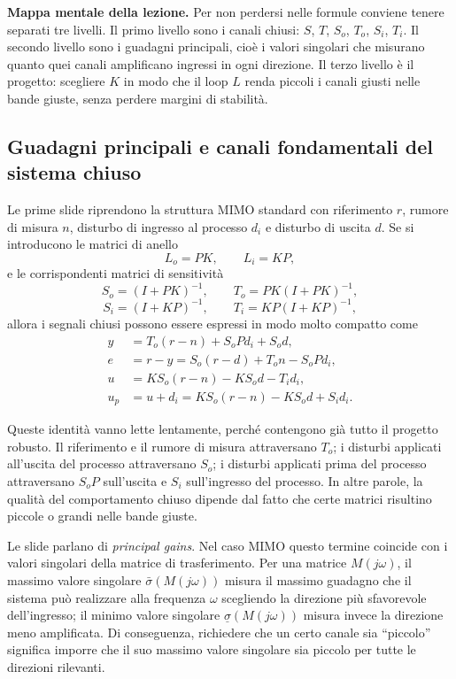 \documentclass[11pt,a4paper]{article}
\begin{document}
\begin{focusbox}
\textbf{Mappa mentale della lezione.} Per non perdersi nelle formule conviene tenere separati tre livelli. Il primo livello sono i canali chiusi: $S$, $T$, $S_o$, $T_o$, $S_i$, $T_i$. Il secondo livello sono i guadagni principali, cioè i valori singolari che misurano quanto quei canali amplificano ingressi in ogni direzione. Il terzo livello è il progetto: scegliere $K$ in modo che il loop $L$ renda piccoli i canali giusti nelle bande giuste, senza perdere margini di stabilità.
\end{focusbox}

\subsection{Guadagni principali e canali fondamentali del sistema chiuso}

Le prime slide riprendono la struttura MIMO standard con riferimento $r$, rumore di misura $n$, disturbo di ingresso al processo $d_i$ e disturbo di uscita $d$. Se si introducono le matrici di anello
$$
L_o = PK,
\qquad
L_i = KP,
$$
e le corrispondenti matrici di sensitività
$$
S_o = (I + PK)^{-1},
\qquad
T_o = PK(I + PK)^{-1},
$$
$$
S_i = (I + KP)^{-1},
\qquad
T_i = KP(I + KP)^{-1},
$$
allora i segnali chiusi possono essere espressi in modo molto compatto come
\begin{align*}
y &= T_o(r-n) + S_o P d_i + S_o d, \\
e &= r-y = S_o(r-d) + T_o n - S_o P d_i, \\
u &= K S_o(r-n) - K S_o d - T_i d_i, \\
u_p &= u + d_i = K S_o(r-n) - K S_o d + S_i d_i.
\end{align*}

Queste identità vanno lette lentamente, perché contengono già tutto il progetto robusto. Il riferimento e il rumore di misura attraversano $T_o$; i disturbi applicati all'uscita del processo attraversano $S_o$; i disturbi applicati prima del processo attraversano $S_oP$ sull'uscita e $S_i$ sull'ingresso del processo. In altre parole, la qualità del comportamento chiuso dipende dal fatto che certe matrici risultino piccole o grandi nelle bande giuste.

Le slide parlano di \emph{principal gains}. Nel caso MIMO questo termine coincide con i valori singolari della matrice di trasferimento. Per una matrice $M(j\omega)$, il massimo valore singolare $\bar{\sigma}(M(j\omega))$ misura il massimo guadagno che il sistema può realizzare alla frequenza $\omega$ scegliendo la direzione più sfavorevole dell'ingresso; il minimo valore singolare $\underline{\sigma}(M(j\omega))$ misura invece la direzione meno amplificata. Di conseguenza, richiedere che un certo canale sia ``piccolo'' significa imporre che il suo massimo valore singolare sia piccolo per tutte le direzioni rilevanti.
\end{document}
